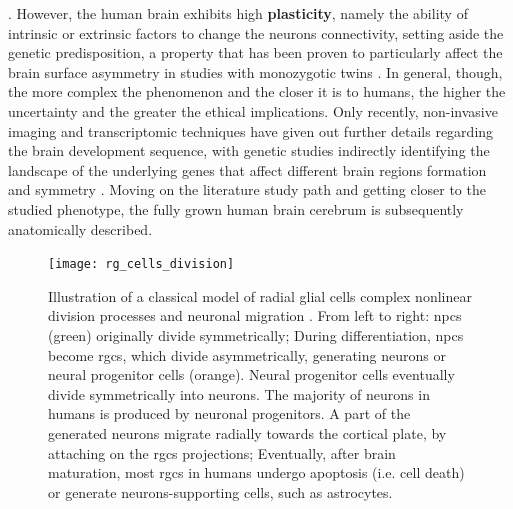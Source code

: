 \cite{Schmitz2019,Cara2022}. However, the human brain exhibits high \textbf{plasticity}, namely the ability of intrinsic or extrinsic factors to change the neurons connectivity, setting aside the genetic predisposition, a property that has been proven to particularly affect the brain surface asymmetry in studies with monozygotic twins \cite{White2002,Manzano2018}. In general, though, the more complex the phenomenon and the closer it is to humans, the higher the uncertainty and the greater the ethical implications. Only recently, non-invasive imaging and transcriptomic techniques have given out further details regarding the brain development sequence, with genetic studies indirectly identifying the landscape of the underlying genes that affect different brain regions formation and symmetry \cite{Cara2022}. Moving on the literature study path and getting closer to the studied phenotype, the fully grown human brain cerebrum is subsequently anatomically described.

\begin{figure}[H]
	\centering
	\texttt{[image: rg\_cells\_division]}\\
	\caption[A classical model of radial glial cells division processes \cite{Rakic2009}]{Illustration of a classical model of radial glial cells complex nonlinear division processes and neuronal migration \cite{Rakic2009}. From left to right: \acsp{npc} (green) originally divide symmetrically; During differentiation, \acsp{npc} become \acsp{rgc}, which divide asymmetrically, generating neurons or neural progenitor cells (orange). Neural progenitor cells eventually divide symmetrically into neurons. The majority of neurons in humans is produced by neuronal progenitors. A part of the generated neurons migrate radially towards the cortical plate, by attaching on the \acsp{rgc} projections; Eventually, after brain maturation, most \acsp{rgc} in humans undergo apoptosis (i.e. cell death) or generate neurons-supporting cells, such as astrocytes.}
	\label{fig:rgc}
\end{figure}


